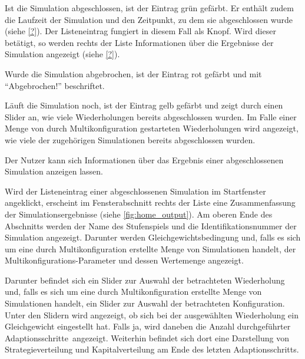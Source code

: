 \documentclass[parskip=full,11pt]{scrartcl}
\def\adapt{Adaptionsschritt}
\def\adapts{Adaptionsschritte}
\begin{document}
Ist die Simulation abgeschlossen, ist der Eintrag grün gefärbt. Er enthält zudem die Laufzeit der Simulation und den Zeitpunkt, zu dem sie abgeschlossen wurde (siehe \cref{?}). Der Listeneintrag fungiert in diesem Fall als Knopf. Wird dieser betätigt, so werden rechts der Liste Informationen über die Ergebnisse der Simulation angezeigt (siehe \cref{?}).

Wurde die Simulation abgebrochen, ist der Eintrag rot gefärbt und mit \enquote{Abgebrochen!} beschriftet.

Läuft die Simulation noch, ist der Eintrag gelb gefärbt und zeigt durch einen Slider an, wie viele Wiederholungen bereits abgeschlossen wurden. Im Falle einer Menge von durch Multikonfiguration gestarteten Wiederholungen wird angezeigt, wie viele der zugehörigen Simulationen bereits abgeschlossen wurden.

Der Nutzer kann sich Informationen über das Ergebnis einer abgeschlossenen Simulation anzeigen lassen.

Wird der Listeneintrag einer abgeschlossenen Simulation im Startfenster angeklickt, erscheint im Fensterabschnitt rechts der Liste eine Zusammenfassung der Simulationsergebnisse (siehe \cref{fig:home_output}). Am oberen Ende des Abschnitts werden der Name des Stufenspiels und die Identifikationsnummer der Simulation angezeigt. Darunter werden Gleichgewichtsbedingung und, falls es sich um eine durch Multikonfiguration erstellte Menge von Simulationen handelt, der Multikonfigurations-Parameter und dessen Wertemenge angezeigt.

Darunter befindet sich ein Slider zur Auswahl der betrachteten Wiederholung und, falls es sich um eine durch Multikonfiguration erstellte Menge von Simulationen handelt, ein Slider zur Auswahl der betrachteten Konfiguration. Unter den Slidern wird angezeigt, ob sich bei der ausgewählten Wiederholung ein Gleichgewicht eingestellt hat. Falls ja, wird daneben die Anzahl durchgeführter \adapts\ angezeigt. Weiterhin befindet sich dort eine Darstellung von Strategieverteilung und Kapitalverteilung am Ende des letzten \adapt s.
\end{document}
